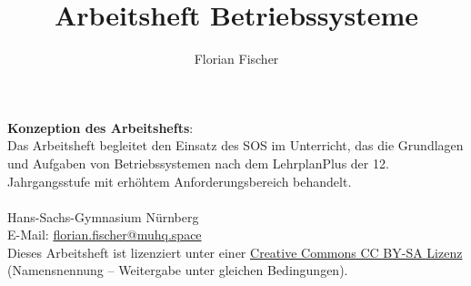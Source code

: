 \documentclass[12pt]{article}
\author{Florian Fischer}
\title{Arbeitsheft Betriebssysteme}
\begin{document}
\pagestyle{empty}

\pagecolor{bgcolor}\afterpage{\nopagecolor}
{}


\pagestyle{fancy}

\tableofcontents
\vfill{}
{
\onehalfspacing
\setlength\parindent{0pt}
\textbf{\large Konzeption des Arbeitshefts}: \\[0.3cm]

Das Arbeitsheft begleitet den Einsatz des \gls{SOS} im Unterricht, das die Grundlagen und Aufgaben von Betriebssystemen nach dem LehrplanPlus der 12. Jahrgangsstufe mit erhöhtem Anforderungsbereich behandelt. \\[0.2cm]

\textbf{\theauthor} \\
Hans-Sachs-Gymnasium Nürnberg \\
E-Mail: \href{mailto:florian.fischer@muhq.space}{florian.fischer@muhq.space} \\[0.2cm]

Dieses Arbeitsheft ist lizenziert unter einer \href{https://creativecommons.org/licenses/by-sa/4.0/}{Creative Commons CC BY-SA Lizenz} (Namensnennung – Weitergabe unter gleichen Bedingungen).
}
\end{document}
